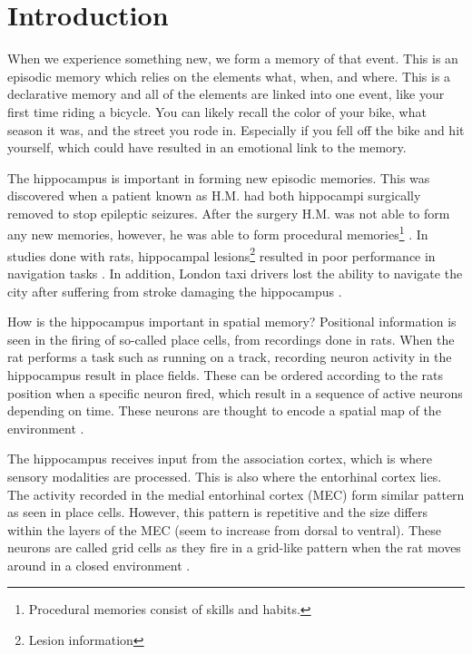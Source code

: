 \section{Introduction}\label{sec:introduction}
When we experience something new, we form a memory of that event. This is an episodic memory which relies on the elements what, when, and where. This is a declarative memory and all of the elements are linked into one event, like your first time riding a bicycle. You can likely recall the color of your bike, what season it was, and the street you rode in. Especially if you fell off the bike and hit yourself, which could have resulted in an emotional link to the memory.

The hippocampus is important in forming new episodic memories. This was discovered when a patient known as H.M. had both hippocampi surgically removed to stop epileptic seizures. After the surgery H.M. was not able to form any new memories, however, he was able to form procedural memories\footnote{Procedural memories consist of skills and habits.} \cite{scoville:1957:loss_recent}. In studies done with rats, hippocampal lesions\footnote{Lesion information} resulted in poor performance in navigation tasks \cite{kaada:1961:maze, schlesiger:2013:hippocampal_activation_maze}. In addition, London taxi drivers lost the ability to navigate the city after suffering from stroke damaging the hippocampus \cite{maguire:2000:navigation}.

How is the hippocampus important in spatial memory? Positional information is seen in the firing of so-called place cells, from recordings done in rats. When the rat performs a task such as running on a track, recording neuron activity in the hippocampus result in place fields. These can be ordered according to the rats position when a specific neuron fired, which result in a sequence of active neurons depending on time. These neurons are thought to encode a spatial map of the environment \cite{okeefe:1978:hippocampus}. 

The hippocampus receives input from the association cortex, which is where sensory modalities are processed. This is also where the entorhinal cortex lies. The activity recorded in the medial entorhinal cortex (MEC) form similar pattern as seen in place cells. However, this pattern is repetitive and the size differs within the layers of the MEC (seem to increase from dorsal to ventral). These neurons are called grid cells as they fire in a grid-like pattern when the rat moves around in a closed environment \cite{hafting:2005:microstructure}.

